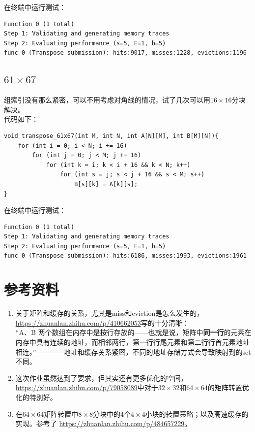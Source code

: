 \documentclass[12pt, a4paper, oneside]{ctexart}
\begin{document}
在终端中运行测试：
\begin{lstlisting}
Function 0 (1 total)
Step 1: Validating and generating memory traces
Step 2: Evaluating performance (s=5, E=1, b=5)
func 0 (Transpose submission): hits:9017, misses:1228, evictions:1196
\end{lstlisting}
\subsection{$61\times67$}
\noindent
组索引没有那么紧密，可以不用考虑对角线的情况，试了几次可以用$16\times16$分块解决。\\
代码如下：
\begin{lstlisting}
void transpose_61x67(int M, int N, int A[N][M], int B[M][N]){
    for (int i = 0; i < N; i += 16)
        for (int j = 0; j < M; j += 16)
            for (int k = i; k < i + 16 && k < N; k++)
                for (int s = j; s < j + 16 && s < M; s++)
                    B[s][k] = A[k][s];
}
\end{lstlisting}
在终端中运行测试：
\begin{lstlisting}
Function 0 (1 total)
Step 1: Validating and generating memory traces
Step 2: Evaluating performance (s=5, E=1, b=5)
func 0 (Transpose submission): hits:6186, misses:1993, evictions:1961
\end{lstlisting}
\section{参考资料}
\noindent
\begin{enumerate}
    \item 关于矩阵和缓存的关系，尤其是miss和eviction是怎么发生的，\\
    \href{https://zhuanlan.zhihu.com/p/410662053}{https://zhuanlan.zhihu.com/p/410662053}写的十分清晰：\\
    “A、B 两个数组在内存中是按行存放的——也就是说，矩阵中\textbf{同一行}的元素在内存中具有连续的地址，而相邻两行，第一行行尾元素和第二行行首元素地址相连。”————地址和缓存关系紧密，不同的地址存储方式会导致映射到的set不同。
    \item 这次作业虽然达到了要求，但其实还有更多优化的空间，\\
    \href{https://zhuanlan.zhihu.com/p/79058089}{https://zhuanlan.zhihu.com/p/79058089}中对于$32\times32$和$64\times64$的矩阵转置优化的特别好。
    \item 在$64\times64$矩阵转置中$8\times8$分块中的4个$4\times4$小块的转置策略；以及高速缓存的实现。参考了
    \href{https://zhuanlan.zhihu.com/p/484657229}{https://zhuanlan.zhihu.com/p/484657229}。
\end{enumerate}
\end{document}
